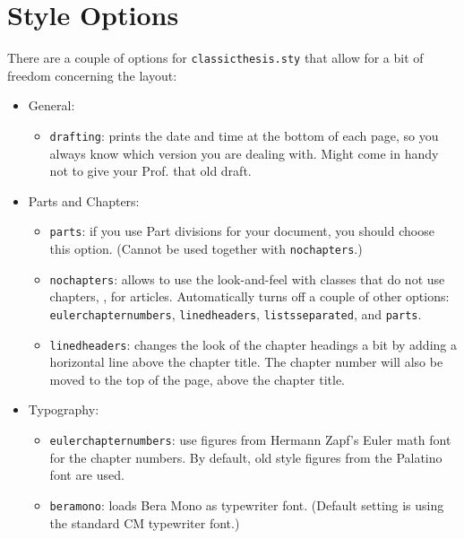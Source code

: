 \clearpage
\section{Style Options}\label{sec:options}
There are a couple of options for \texttt{classicthesis.sty} that
allow for a bit of freedom concerning the layout:
\begin{itemize}
    \item General:
    \begin{itemize}
        \item\texttt{drafting}: prints the date and time at the bottom of
        each page, so you always know which version you are dealing with.
        Might come in handy not to give your Prof. that old draft.
    \end{itemize}
    
    \item Parts and Chapters:
    \begin{itemize}
        \item\texttt{parts}: if you use Part divisions for your document,
        you should choose this option. (Cannot be used together with 
        \texttt{nochapters}.)
        
        \item\texttt{nochapters}: allows to use the look-and-feel with 
        classes that do not use chapters, \eg, for articles. Automatically
        turns off a couple of other options: \texttt{eulerchapternumbers}, 
        \texttt{linedheaders}, \texttt{listsseparated}, and \texttt{parts}. 
        
        \item\texttt{linedheaders}: changes the look of the chapter
        headings a bit by adding a horizontal line above the chapter
        title. The chapter number will also be moved to the top of the
        page, above the chapter title.
        
    \end{itemize}
    
    \item Typography:
    \begin{itemize}
        \item\texttt{eulerchapternumbers}: use figures from Hermann Zapf's
        Euler math font for the chapter numbers. By default, old style
        figures from the Palatino font are used.
        
        \item\texttt{beramono}: loads Bera Mono as typewriter font. 
        (Default setting is using the standard CM typewriter font.)
        

\end{itemize}
\end{itemize}
